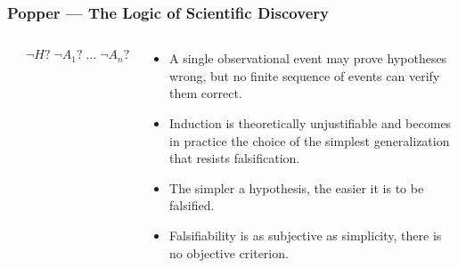 \documentclass[UTF8,11pt,colorlinks,compress,openany]{beamer}%
\begin{document}
\begin{frame}\frametitle{Popper --- The Logic of Scientific Discovery}
	\begin{columns}[onlytextwidth]
	\begin{prooftree}
	\noLine
	\alwaysSingleLine
\end{prooftree}
\[\neg H?\; \neg A_1?\;\dots\;\neg A_n?\]
			\begin{proposition}[Popper]
				\begin{itemize}
					\item A single observational event may prove hypotheses wrong, but no finite sequence of events can verify them correct. 
					\item Induction is theoretically unjustifiable and becomes in practice the choice of the simplest generalization that resists falsification.
					\item The simpler a hypothesis, the easier it is to be falsified.
					\item Falsifiability is as subjective as simplicity, there is no objective criterion.
				\end{itemize}
			\end{proposition}
	\end{columns}	
\end{frame}
\end{document}
